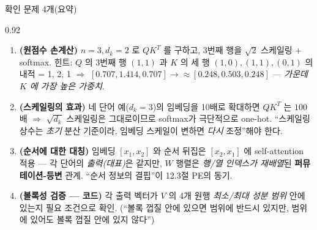\begin{frame}{확인 문제 4개(요약)}
\begin{center}\begin{varwidth}{0.92\textwidth}
  \begin{enumerate}
    \item \textbf{(원점수 손계산)} $n=3, d_k=2$ 로 $QK^T$ 를
      구하고, 3번째 행을 $\sqrt{2}$ 스케일링 + softmax.
      힌트: $Q$ 의 3번째 행 $(1,1)$ 과 $K$ 의 세 행
      $(1,0),(1,1),(0,1)$ 의 내적 = 1, 2, 1 $\Rightarrow$
      $[0.707, 1.414, 0.707] \to \approx [0.248, 0.503, 0.248]$
      — \emph{가운데 $K$ 에 가장 높은 가중치}.
    \item \textbf{(스케일링의 효과)} 네 단어 예($d_k=3$)의
      임베딩을 10배로 확대하면 $QK^T$ 는 $100$배 $\Rightarrow$
      $\sqrt{d_k}$ 스케일링은 그대로이므로 softmax가 극단적으로
      one-hot. ``스케일링 상수는 \emph{초기} 분산 기준이라,
      임베딩 스케일이 변하면 \emph{다시} 조정''해야 한다.
    \item \textbf{(순서에 대한 대칭)} 임베딩 $[x_1, x_2]$ 와
      순서 뒤집은 $[x_2, x_1]$ 에 self-attention 적용 —
      각 단어의 \emph{출력(대표)}은 같지만, $W$ 행렬은
      \emph{행/열 인덱스가 재배열}된
      \textbf{퍼뮤테이션-등변} 관계. ``순서 정보의 결핍''이
      12.3절 PE의 동기.
    \item \textbf{(볼록성 검증 — 코드)} 각 출력 벡터가 $V$ 의
      4개 원행 \emph{최소/최대 성분 범위} 안에 있는지 필요
      조건으로 확인. (``볼록 껍질 안에 있으면 범위에 반드시
      있지만, 범위에 있어도 볼록 껍질 안에 있지 않다'')
  \end{enumerate}
\end{varwidth}\end{center}
\end{frame}
